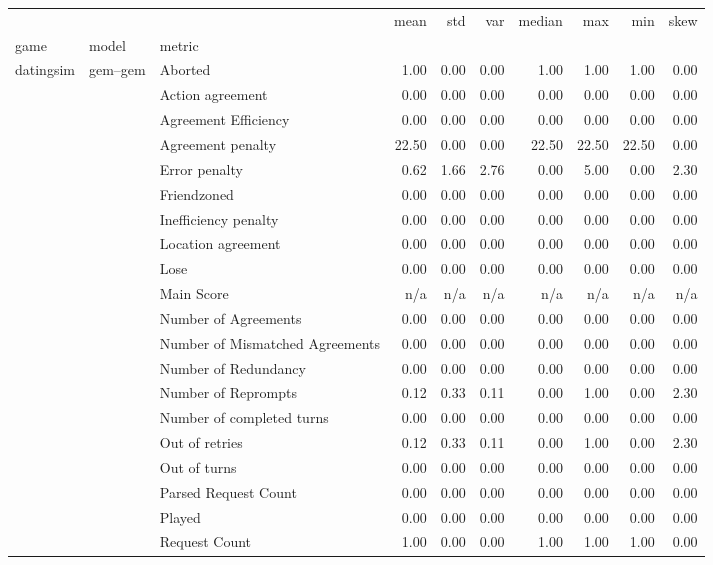 \begin{tabular}{lllrrrrrrr}
\toprule
 &  &  & mean & std & var & median & max & min & skew \\
game & model & metric &  &  &  &  &  &  &  \\
\midrule
\multirow[t]{189}{*}{datingsim} & \multirow[t]{27}{*}{gem--gem} & Aborted & 1.00 & 0.00 & 0.00 & 1.00 & 1.00 & 1.00 & 0.00 \\
 &  & Action agreement & 0.00 & 0.00 & 0.00 & 0.00 & 0.00 & 0.00 & 0.00 \\
 &  & Agreement Efficiency & 0.00 & 0.00 & 0.00 & 0.00 & 0.00 & 0.00 & 0.00 \\
 &  & Agreement penalty & 22.50 & 0.00 & 0.00 & 22.50 & 22.50 & 22.50 & 0.00 \\
 &  & Error penalty & 0.62 & 1.66 & 2.76 & 0.00 & 5.00 & 0.00 & 2.30 \\
 &  & Friendzoned & 0.00 & 0.00 & 0.00 & 0.00 & 0.00 & 0.00 & 0.00 \\
 &  & Inefficiency penalty & 0.00 & 0.00 & 0.00 & 0.00 & 0.00 & 0.00 & 0.00 \\
 &  & Location agreement & 0.00 & 0.00 & 0.00 & 0.00 & 0.00 & 0.00 & 0.00 \\
 &  & Lose & 0.00 & 0.00 & 0.00 & 0.00 & 0.00 & 0.00 & 0.00 \\
 &  & Main Score & n/a & n/a & n/a & n/a & n/a & n/a & n/a \\
 &  & Number of Agreements & 0.00 & 0.00 & 0.00 & 0.00 & 0.00 & 0.00 & 0.00 \\
 &  & Number of Mismatched Agreements & 0.00 & 0.00 & 0.00 & 0.00 & 0.00 & 0.00 & 0.00 \\
 &  & Number of Redundancy & 0.00 & 0.00 & 0.00 & 0.00 & 0.00 & 0.00 & 0.00 \\
 &  & Number of Reprompts & 0.12 & 0.33 & 0.11 & 0.00 & 1.00 & 0.00 & 2.30 \\
 &  & Number of completed turns & 0.00 & 0.00 & 0.00 & 0.00 & 0.00 & 0.00 & 0.00 \\
 &  & Out of retries & 0.12 & 0.33 & 0.11 & 0.00 & 1.00 & 0.00 & 2.30 \\
 &  & Out of turns & 0.00 & 0.00 & 0.00 & 0.00 & 0.00 & 0.00 & 0.00 \\
 &  & Parsed Request Count & 0.00 & 0.00 & 0.00 & 0.00 & 0.00 & 0.00 & 0.00 \\
 &  & Played & 0.00 & 0.00 & 0.00 & 0.00 & 0.00 & 0.00 & 0.00 \\
 &  & Request Count & 1.00 & 0.00 & 0.00 & 1.00 & 1.00 & 1.00 & 0.00 \\

\end{tabular}
